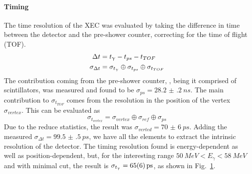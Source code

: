 \begin{refsection}
        \paragraph{Timing}
        The time resolution of the XEC was evaluated by taking the difference in time between the detector and the pre-shower counter, correcting for the time of flight (TOF).
        \begin{align}
            \Delta t &= t_\g - t_{ps} - t_{TOF}\\
            \sigma_{\Delta t} &=  \sigma_{t_\g} \oplus \sigma_{t_{ps}} \oplus \sigma_{t_{TOF}}
        \end{align}
        The contribution coming from the pre-shower counter, , being it comprised of scintillators, was measured and found to be $\sigma_{ps}=\SI{28.2(2)}{ns}$.
        The main contribution to $\sigma_{t_{TOF}}$ comes from the resolution in the position of the vertex $\sigma_{vertex}$.
        This can be evaluated as 
        $$\sigma_{t_{vertex}} = \sigma_{vertex} \oplus \sigma_{ref} \oplus \sigma_{ps}$$
        Due to the reduce statistics, the result was $\sigma_{verted} = \SI{70(6)}{ps}$.
        Adding the measured $\sigma_{\Delta t} = \SI{99.5(5)}{ps}$, we have all the elements to extract the intrinsic resolution of the detector.
        The timing resolution found is energy-dependent as well as position-dependent, but, for the interesting range $\SI{50}{MeV}<E_\gamma<\SI{58}{MeV}$ and with minimal cut, the result is $\sigma_{t_\g}=\SI{65(6)}{ps}$, as shown in Fig.~\ref{fig:CEX:2021:timing}. 

        \begin{figure}
            \centering
            \caption{}
            \label{fig:CEX:2021:timing}
        \end{figure}


\end{refsection}
